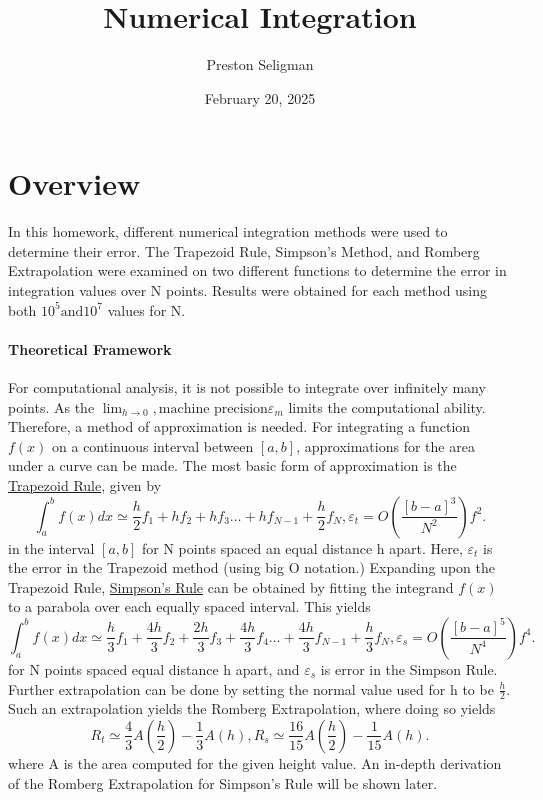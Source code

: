 \documentclass[aps,prb,groupedaddress,nofootinbib,floatfix]{revtex4}
\begin{document}
\author{Preston Seligman}
\title{Numerical Integration}
\date{February 20, 2025}
\maketitle
\section*{Overview}
In this homework, different numerical integration methods were used to determine their error. The Trapezoid Rule, Simpson's Method, and Romberg Extrapolation were examined on two different functions to determine the error in integration values over N points. Results were obtained for each method using both $10^5 \text{and} 10^7$ values for N. 
\paragraph{Theoretical Framework} 
For computational analysis, it is not possible to integrate over infinitely many points. As the $\lim_{h \to 0} ,\text{machine precision} \varepsilon_{m}$ limits the computational ability. Therefore, a method of approximation is needed. For integrating a function $f(x)$ on a continuous interval between $[a,b]$, approximations for the area under a curve can be made. 
The most basic form of approximation is the \ul{Trapezoid Rule}, given by \[
	\int_{a}^{b} f(x)dx \simeq \frac{h}{2}f_{1}+hf_{2}+hf_{3}\ldots+hf_{N-1}+\frac{h}{2}f_{N}, \varepsilon_{t} = O(\frac{[b-a]^3}{N^{2}})f^{2} 
.\] 
in the interval $[a,b]$ for N points spaced an equal distance h apart. Here,  $\varepsilon_{t}$ is the error in the Trapezoid method (using big O notation.)
Expanding upon the Trapezoid Rule, \ul{Simpson's Rule} can be obtained by fitting the integrand $f(x)$ to a parabola over each equally spaced interval. This yields  \[
	\int_{a}^{b} f(x)dx \simeq \frac{h}{3}f_{1}+\frac{4h}{3}f_{2}+\frac{2h}{3}f_{3}+\frac{4h}{3}f_{4}\ldots+\frac{4h}{3}f_{N-1}+\frac{h}{3}f_{N}, \varepsilon_{s}=O(\frac{[b-a]^5}{N^{4}})f^{4} 
.\] 
for N points spaced equal distance h apart, and $\varepsilon_{s}$ is error in the Simpson Rule.
Further extrapolation can be done by setting the normal value used for h to be $\frac{h}{2}$. Such an extrapolation yields the Romberg Extrapolation, where doing so yields \[
	R_{t} \simeq \frac{4}{3}A(\frac{h}{2}) - \frac{1}{3}A(h), R_{s} \simeq \frac{16}{15}A(\frac{h}{2})-\frac{1}{15}A(h)
.\] 
where A is the area computed for the given height value. An in-depth derivation of the Romberg Extrapolation for Simpson's Rule will be shown later.
\end{document}
